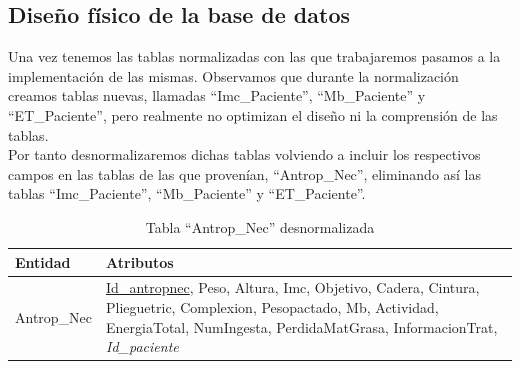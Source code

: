 \subsection{Diseño físico de la base de datos}
Una vez tenemos las tablas normalizadas con las que trabajaremos pasamos a la implementación de las mismas.
Observamos que durante la normalización creamos tablas nuevas, llamadas ``Imc\_Paciente'', ``Mb\_Paciente'' y ``ET\_Paciente'', pero realmente no optimizan el diseño ni la comprensión de las tablas.\\
Por tanto desnormalizaremos dichas tablas volviendo a incluir los respectivos campos en las tablas de las que provenían, ``Antrop\_Nec'', eliminando así las tablas ``Imc\_Paciente'', ``Mb\_Paciente'' y ``ET\_Paciente''.

\begin{table}[H]
\begin{center}
  \begin{tabular}{| l | p{12cm} |}
    \hline
    Entidad & Atributos \\ \hline
    Antrop\_Nec & \underline{Id\_antropnec}, Peso, Altura, Imc, Objetivo, Cadera, Cintura, Plieguetric, Complexion, Pesopactado, Mb, Actividad, EnergiaTotal, NumIngesta, PerdidaMatGrasa, InformacionTrat, \textit{Id\_paciente} \\ 
	\hline
  \end{tabular}
\end{center}
\caption{Tabla ``Antrop\_Nec'' desnormalizada}
\end{table}

\newpage

